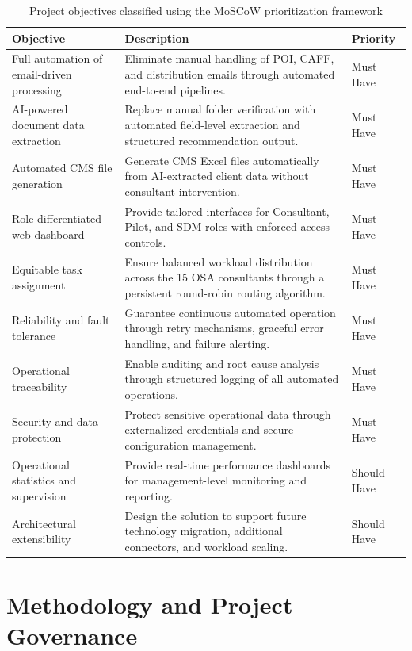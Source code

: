 \begin{table}[H]
  \centering
  \caption{Project objectives classified using the MoSCoW prioritization framework}
  \renewcommand{\arraystretch}{1.0}
  \begin{tabularx}{\textwidth}{|X|X|X|}
    \hline
    \textbf{Objective} & \textbf{Description} & \textbf{Priority} \\ \hline
    Full automation of email-driven processing & Eliminate manual handling of POI, CAFF, and distribution emails through automated end-to-end pipelines. & Must Have \\ \hline
    AI-powered document data extraction & Replace manual folder verification with automated field-level extraction and structured recommendation output. & Must Have \\ \hline
    Automated CMS file generation & Generate CMS Excel files automatically from AI-extracted client data without consultant intervention. & Must Have \\ \hline
    Role-differentiated web dashboard & Provide tailored interfaces for Consultant, Pilot, and SDM roles with enforced access controls. & Must Have \\ \hline
    Equitable task assignment & Ensure balanced workload distribution across the 15 OSA consultants through a persistent round-robin routing algorithm. & Must Have \\ \hline
    Reliability and fault tolerance & Guarantee continuous automated operation through retry mechanisms, graceful error handling, and failure alerting. & Must Have \\ \hline
    Operational traceability & Enable auditing and root cause analysis through structured logging of all automated operations. & Must Have \\ \hline
    Security and data protection & Protect sensitive operational data through externalized credentials and secure configuration management. & Must Have \\ \hline
    Operational statistics and supervision & Provide real-time performance dashboards for management-level monitoring and reporting. & Should Have \\ \hline
    Architectural extensibility & Design the solution to support future technology migration, additional connectors, and workload scaling. & Should Have \\ \hline
  \end{tabularx}
\end{table}

\section{Methodology and Project Governance}

